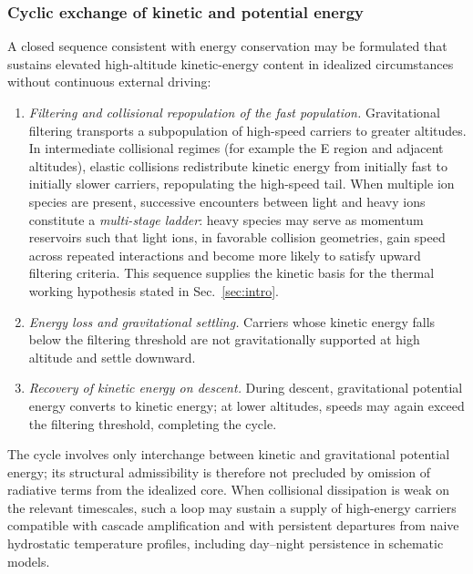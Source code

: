 \documentclass[11pt,a4paper]{article}
\begin{document}
\subsubsection{Cyclic exchange of kinetic and potential energy}
A closed sequence consistent with energy conservation may be formulated that sustains elevated high-altitude kinetic-energy content in idealized circumstances without continuous external driving:
\begin{enumerate}
  \item \emph{Filtering and collisional repopulation of the fast population.} Gravitational filtering transports a subpopulation of high-speed carriers to greater altitudes. In intermediate collisional regimes (for example the E region and adjacent altitudes), elastic collisions redistribute kinetic energy from initially fast to initially slower carriers, repopulating the high-speed tail. When multiple ion species are present, successive encounters between light and heavy ions constitute a \emph{multi-stage ladder}: heavy species may serve as momentum reservoirs such that light ions, in favorable collision geometries, gain speed across repeated interactions and become more likely to satisfy upward filtering criteria. This sequence supplies the kinetic basis for the thermal working hypothesis stated in Sec.~\ref{sec:intro}.
  \item \emph{Energy loss and gravitational settling.} Carriers whose kinetic energy falls below the filtering threshold are not gravitationally supported at high altitude and settle downward.
  \item \emph{Recovery of kinetic energy on descent.} During descent, gravitational potential energy converts to kinetic energy; at lower altitudes, speeds may again exceed the filtering threshold, completing the cycle.
\end{enumerate}
The cycle involves only interchange between kinetic and gravitational potential energy; its structural admissibility is therefore not precluded by omission of radiative terms from the idealized core. When collisional dissipation is weak on the relevant timescales, such a loop may sustain a supply of high-energy carriers compatible with cascade amplification and with persistent departures from naive hydrostatic temperature profiles, including day--night persistence in schematic models.
\end{document}
